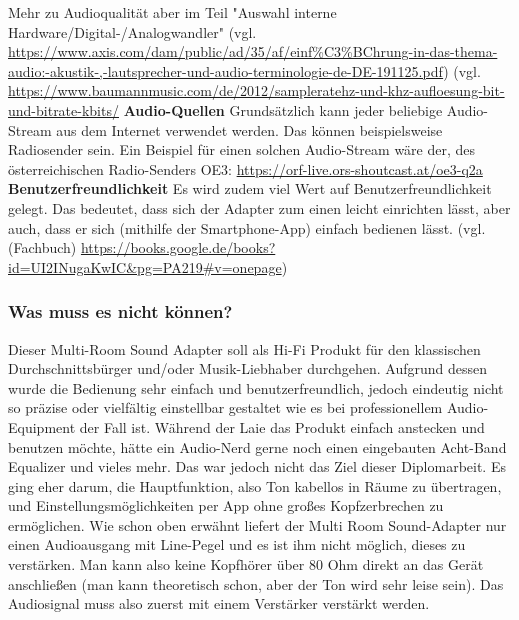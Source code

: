 \documentclass[]{article}
\begin{document}
Mehr zu Audioqualität aber im Teil "Auswahl interne Hardware/Digital-/Analogwandler"
\vspace{4mm} \newline
(vgl. \url{https://www.axis.com/dam/public/ad/35/af/einf%C3%BChrung-in-das-thema-audio:-akustik-,-lautsprecher-und-audio-terminologie-de-DE-191125.pdf}) 
\newline
(vgl. \url{https://www.baumannmusic.com/de/2012/sampleratehz-und-khz-aufloesung-bit-und-bitrate-kbits/}
\vspace{4mm}\newline
\textbf{Audio-Quellen}\newline
Grundsätzlich kann jeder beliebige Audio-Stream aus dem Internet verwendet werden. Das können beispielsweise Radiosender sein.
Ein Beispiel für einen solchen Audio-Stream wäre der, des österreichischen Radio-Senders \glqq OE3\grqq{}: \newline
\url{https://orf-live.ors-shoutcast.at/oe3-q2a}
\vspace{4mm}\newline
\textbf{Benutzerfreundlichkeit}\newline
Es wird zudem viel Wert auf Benutzerfreundlichkeit gelegt. Das bedeutet, dass sich der Adapter zum einen leicht einrichten lässt, aber auch, dass er sich (mithilfe der Smartphone-App) einfach bedienen lässt.
\vspace{4mm} \newline
(vgl. (Fachbuch) \url{https://books.google.de/books?id=UI2INugaKwIC&pg=PA219#v=onepage})
\subsubsection{Was muss es nicht können?}
Dieser Multi-Room Sound Adapter soll als Hi-Fi Produkt für den klassischen Durchschnittsbürger und/oder Musik-Liebhaber durchgehen. Aufgrund dessen wurde die Bedienung sehr einfach und benutzerfreundlich, jedoch eindeutig nicht so präzise oder vielfältig einstellbar gestaltet wie es bei professionellem Audio-Equipment der Fall ist. Während der Laie das Produkt einfach anstecken und benutzen möchte, hätte ein Audio-Nerd gerne noch einen eingebauten Acht-Band Equalizer und vieles mehr. Das war jedoch nicht das Ziel dieser Diplomarbeit. Es ging eher darum, die Hauptfunktion, also Ton kabellos in Räume zu übertragen, und Einstellungsmöglichkeiten per App ohne großes Kopfzerbrechen zu ermöglichen.\newline
Wie schon oben erwähnt liefert der Multi Room Sound-Adapter nur einen Audioausgang mit Line-Pegel und es ist ihm nicht möglich, dieses zu verstärken. Man kann also keine Kopfhörer über 80 Ohm direkt an das Gerät anschließen (man kann theoretisch schon, aber der Ton wird sehr leise sein). Das Audiosignal muss also zuerst mit einem Verstärker verstärkt werden.\newline
\end{document}
